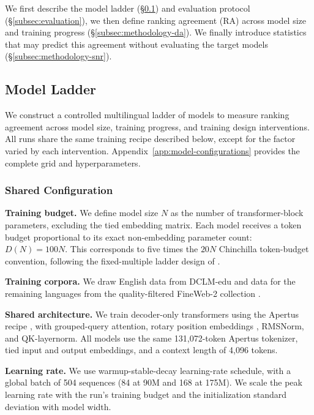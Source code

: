 We first describe the model ladder (\S\ref{subsec:models}) and evaluation protocol (\S\ref{subsec:evaluation}), we then define ranking agreement (RA) across model size and training progress (\S\ref{subsec:methodology-da}). We finally introduce statistics that may predict this agreement without evaluating the target models (\S\ref{subsec:methodology-snr}). 

\subsection{Model Ladder}
\label{subsec:models}

We construct a controlled multilingual ladder of \nmodels models to measure ranking agreement across model size, training progress, and training design interventions. 
All runs share the same training recipe described below, except for the factor varied by each intervention. 
Appendix~\ref{app:model-configurations} provides the complete grid and hyperparameters.

\subsubsection{Shared Configuration}

\textbf{Training budget.}
We define model size $N$ as the number of transformer-block parameters, excluding the tied embedding matrix. Each model receives a token budget proportional to its exact non-embedding parameter count:
$D(N) = 100N.$
This corresponds to five times the $20N$ Chinchilla token-budget convention, %
following the fixed-multiple ladder design of 
\citet{magnusson_datadecide_2025}. 

\textbf{Training corpora.}
We draw English data from DCLM-edu \citep{li_datacomp-lm_2025} and data for the remaining languages from the quality-filtered FineWeb-2 collection \citep{penedo_fineweb2_2025,messmer_enhancing_2026}. %

\textbf{Shared architecture.} We train decoder-only transformers using the Apertus recipe \citep{apertus_apertus_2025}, with grouped-query attention,
rotary position embeddings \citep{su_roformer_2023}, RMSNorm, and QK-layernorm. All models use the same 131,072-token Apertus tokenizer, tied input and output embeddings, and a context length of 4,096 tokens. 

\textbf{Learning rate.}
We use warmup-stable-decay learning-rate schedule, %
with a global batch of 504 sequences (84 at 90M and 168 at 175M). We scale the peak learning rate with the run's training budget and the initialization standard deviation with model width.

